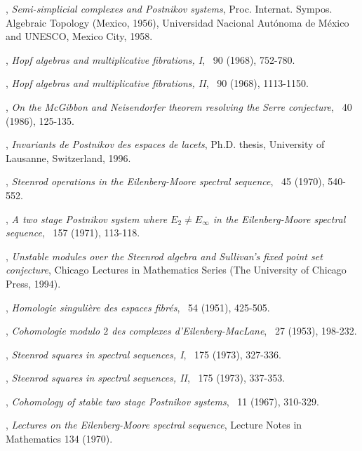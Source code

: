 \begin{thebibliography}{99}
, \textit{Semi-simplicial complexes and Postnikov systems}, Proc. Internat. Sympos. Algebraic Topology (Mexico, 1956), Universidad Nacional Aut\'onoma de M\'exico and UNESCO, Mexico City, 1958.

, \textit{Hopf algebras and multiplicative fibrations, I}, \AMEJM\ 90 (1968), 752-780.

, \textit{Hopf algebras and multiplicative fibrations, II}, \AMEJM\ 90 (1968), 1113-1150.

, \textit{On the McGibbon and Neisendorfer theorem resolving the Serre conjecture}, \MEMFS\ 40 (1986), 125-135.

, \textit{Invariants de Postnikov des espaces de lacets}, Ph.D. thesis, University of Lausanne, Switzerland, 1996.

, \textit{Steenrod operations in the Eilenberg-Moore spectral sequence}, \COMMH\ 45 (1970), 540-552.

, \textit{A two stage Postnikov system where $E_2\not=E_\infty$ in the Eilenberg-Moore spectral sequence}, \TRAAM\ 157 (1971), 113-118.

, \textit{Unstable modules over the Steenrod algebra and Sullivan's fixed point set conjecture}, Chicago Lectures in Mathematics Series (The University of Chicago Press, 1994).

, \textit{Homologie singuli\`ere des espaces fibr\' es}, \ANNMAone\ 54 (1951), 425-505.

, \textit{Cohomologie modulo $2$ des complexes d'Eilenberg-MacLane}, \COMMH\ 27 (1953), 198-232.

, \textit{Steenrod squares in spectral sequences, I}, \TRAAM\ 175 (1973), 327-336.

, \textit{Steenrod squares in spectral sequences, II}, \TRAAM\ 175 (1973), 337-353.

, \textit{Cohomology of stable two stage Postnikov systems}, \ILLJM\ 11 (1967), 310-329.

, \textit{Lectures on the Eilenberg-Moore spectral sequence}, Lecture Notes in Mathematics 134 (1970).


\end{thebibliography}
